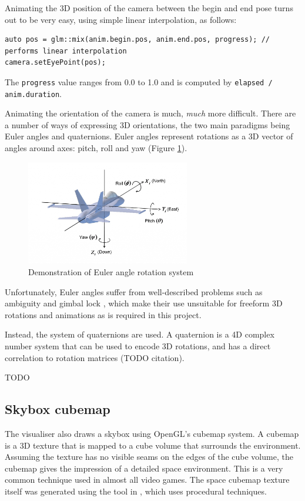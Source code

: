 \documentclass[11pt]{article}
\begin{document}
Animating the 3D position of the camera between the begin and end pose turns out to be very easy, using simple
linear interpolation, as follows:

\begin{verbatim}
auto pos = glm::mix(anim.begin.pos, anim.end.pos, progress); // performs linear interpolation
camera.setEyePoint(pos);
\end{verbatim}

The \verb|progress| value ranges from 0.0 to 1.0 and is computed by \verb|elapsed / anim.duration|.

Animating the orientation of the camera is much, \textit{much} more difficult. There are a number of ways of
expressing 3D orientations, the two main paradigms being Euler angles and quaternions. Euler angles represent
rotations as a 3D vector of angles around axes: pitch, roll and yaw (Figure \ref{fig:euler}).

\begin{figure}[H]
\centering
\includegraphics[width=270px]{img/euler.png}
\caption{Demonstration of Euler angle rotation system}
\label{fig:euler}
\end{figure}

Unfortunately, Euler angles suffer from well-described problems such as ambiguity and gimbal lock
\cite{Hemingway2018}, which make their use unsuitable for freeform 3D rotations and animations as is required
in this project.

Instead, the system of quaternions are used. A quaternion is a 4D complex number system that can be used to
encode 3D rotations, and has a direct correlation to rotation matrices (TODO citation).

TODO

\subsection{Skybox cubemap}
The visualiser also draws a skybox using OpenGL's cubemap system. A cubemap is a 3D texture that is mapped to
a cube volume that surrounds the environment. Assuming the texture has no visible seams on the edges of the
cube volume, the cubemap gives the impression of a detailed space environment. This is a very common technique
used in almost all video games. The space cubemap texture itself was generated using the tool in
\cite{tyroSpace}, which uses procedural techniques.
\end{document}
